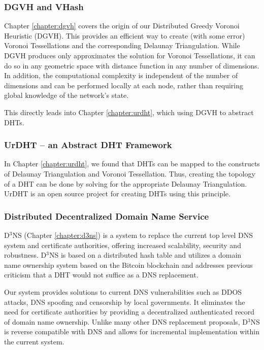 \subsubsection{DGVH and VHash}

Chapter \ref{chapter:dgvh} covers the origin of our Distributed Greedy Voronoi Heuristic (DGVH).
This provides an efficient way to create (with some error) Voronoi Tessellations and the corresponding Delaunay Triangulation.
While DGVH produces only approximates the solution for Voronoi Tessellations, it can do so in any geometric space with distance function in any number of dimensions.
In addition, the computational complexity is independent of the number of dimensions and can be performed locally at each node, rather than requiring global knowledge of the network's state.

This directly leads into Chapter \ref{chapter:urdht}, which using DGVH to abstract DHTs.

\subsubsection{UrDHT -- an Abstract DHT Framework}
In Chapter \ref{chapter:urdht}, we found that DHTs can be mapped to the constructs of Delaunay Triangulation and Voronoi Tessellation.
Thus, creating the topology of a DHT can be done by solving for the appropriate Delaunay Triangulation.
UrDHT is an open source project for creating DHTs using this principle.



\subsubsection{Distributed Decentralized Domain Name Service}
D$^{3}$NS (Chapter \ref{chapter:d3ns}) is a system to replace the current top level DNS system and certificate authorities, offering increased scalability, security and robustness. 
D$^{3}$NS is based on a distributed hash table and utilizes a domain name ownership system based on the Bitcoin blockchain \cite{bitcoin} and addresses previous criticism that a DHT would not suffice as a DNS replacement. 

Our system provides solutions to current DNS vulnerabilities such as DDOS attacks, DNS spoofing and censorship by local governments.
It eliminates the need for certificate authorities by providing a decentralized authenticated record of domain name ownership. 
Unlike many other DNS replacement proposals, D$^{3}$NS is reverse compatible with DNS and allows for incremental implementation within the current system.

